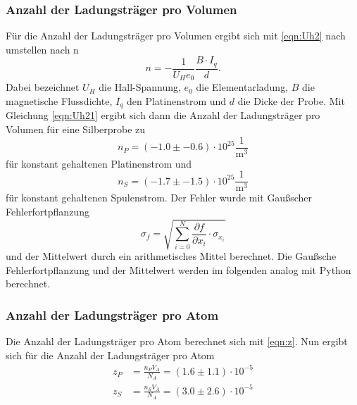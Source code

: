     \subsubsection{Anzahl der Ladungsträger pro Volumen}
    \label{sec:ladtrprovol}
        Für die Anzahl der Ladungsträger pro Volumen ergibt sich mit \ref{eqn:Uh2} nach umstellen nach n
        \begin{equation}
            n=-\frac{1}{U_{H} e_0}\frac{B\cdot I_q}{d}. \label{eqn:Uh21}
          \end{equation}
          Dabei bezeichnet $U_{H}$ die Hall-Spannung, $e_{0}$ die Elementarladung, $B$ die magnetische Flussdichte, $I_{q}$ den Platinenstrom und $d$ die Dicke
          der Probe. Mit Gleichung \ref{eqn:Uh21} ergibt sich dann die Anzahl der Ladungsträger pro Volumen für eine Silberprobe zu
          \begin{equation*}
            n_{P} = (-1.0 \pm -0.6) \cdot 10^{25} \frac{1}{\si{\cubic\meter}}
          \end{equation*}
          für konstant gehaltenen Platinenstrom und
          \begin{equation*}
            n_{S} = (-1.7 \pm -1.5) \cdot 10^{25} \frac{1}{\si{\cubic\meter}}
          \end{equation*}
        für konstant gehaltenen Spulenstrom.
        Der Fehler wurde mit Gaußscher Fehlerfortpflanzung
        \begin{equation}
          \sigma_f = \sqrt{\sum_{i=0}^{N} {\frac{\partial f}{\partial x_i} \cdot \sigma_{x_i}}}
          \label{eqn:gauss}
        \end{equation}
        und der Mittelwert durch ein arithmetisches Mittel berechnet. Die Gaußsche Fehlerfortpflanzung und der
        Mittelwert werden im folgenden analog mit Python berechnet.
    \subsubsection{Anzahl der Ladungsträger pro Atom}
      Die Anzahl der Ladungsträger pro Atom berechnet sich mit \ref{eqn:z}.
       Nun ergibt sich für die Anzahl der Ladungsträger pro Atom
       \begin{align*}
         z_{P} & = \frac{n_{P} V_{A}}{N_A} = (1.6 \pm 1.1) \cdot 10^{-5} \\
         z_{S} & = \frac{n_{S} V_{A}}{N_A} = (3.0 \pm 2.6) \cdot 10^{-5}
       \end{align*}
